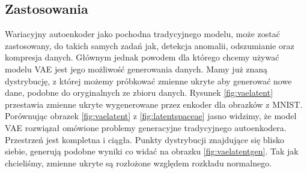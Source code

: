 \documentclass[a4paper,12pt]{book} %
\begin{document}
\subsection{Zastosowania}
Wariacyjny autoenkoder jako pochodna tradycyjnego modelu, może zostać zastosowany, do takich samych zadań jak, detekcja anomalii, odszumianie oraz kompresja danych. Głównym jednak powodem dla którego chcemy używać modelu VAE jest jego możliwość generowania danych. Mamy już znaną dystrybucję, z której możemy próbkować zmienne ukryte aby generować nowe dane, podobne do oryginalnych ze zbioru danych. Rysunek \ref{fig:vaelatent} przestawia zmienne ukryte wygenerowane przez enkoder dla obrazków z MNIST. Porównując obrazek \ref{fig:vaelatent} z \ref{fig:latentspaceae} jasno widzimy, że model VAE rozwiązał omówione problemy generacyjne tradycyjnego autoenkodera. Przestrzeń jest kompletna i ciągła. Punkty dystrybucji znajdujące się blisko siebie, generują podobne wyniki co widać na obrazku \ref{fig:vaelatentgen}. Tak jak chcieliśmy, zmienne ukryte są rozłożone względem rozkładu normalnego. 
\end{document}
